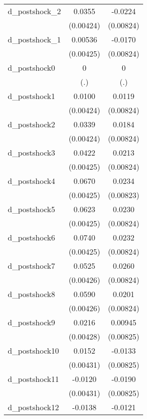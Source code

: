 {\begin{tabular}{l*{2}{c}}
d\_postshock\_2&   0.0355\sym{***}&  -0.0224\sym{**} \\
          &(0.00424)         &(0.00824)         \\
d\_postshock\_1&  0.00536         &  -0.0170\sym{*}  \\
          &(0.00425)         &(0.00824)         \\
d\_postshock0&        0         &        0         \\
          &      (.)         &      (.)         \\
d\_postshock1&   0.0100\sym{*}  &   0.0119         \\
          &(0.00424)         &(0.00824)         \\
d\_postshock2&   0.0339\sym{***}&   0.0184\sym{*}  \\
          &(0.00424)         &(0.00824)         \\
d\_postshock3&   0.0422\sym{***}&   0.0213\sym{**} \\
          &(0.00425)         &(0.00824)         \\
d\_postshock4&   0.0670\sym{***}&   0.0234\sym{**} \\
          &(0.00425)         &(0.00823)         \\
d\_postshock5&   0.0623\sym{***}&   0.0230\sym{**} \\
          &(0.00425)         &(0.00824)         \\
d\_postshock6&   0.0740\sym{***}&   0.0232\sym{**} \\
          &(0.00425)         &(0.00824)         \\
d\_postshock7&   0.0525\sym{***}&   0.0260\sym{**} \\
          &(0.00426)         &(0.00824)         \\
d\_postshock8&   0.0590\sym{***}&   0.0201\sym{*}  \\
          &(0.00426)         &(0.00824)         \\
d\_postshock9&   0.0216\sym{***}&  0.00945         \\
          &(0.00428)         &(0.00825)         \\
d\_postshock10&   0.0152\sym{***}&  -0.0133         \\
          &(0.00431)         &(0.00825)         \\
d\_postshock11&  -0.0120\sym{**} &  -0.0190\sym{*}  \\
          &(0.00431)         &(0.00825)         \\
d\_postshock12&  -0.0138\sym{**} &  -0.0121         \\

\end{tabular}}
